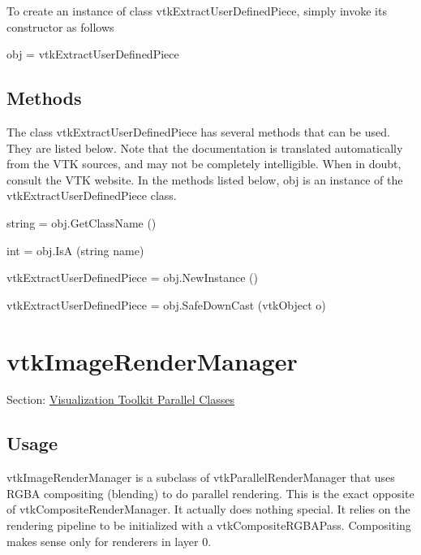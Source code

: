 To create an instance of class vtk\-Extract\-User\-Defined\-Piece, simply invoke its constructor as follows \begin{DoxyVerb}  obj = vtkExtractUserDefinedPiece
\end{DoxyVerb}
 \hypertarget{vtkwidgets_vtkxyplotwidget_Methods}{}\subsection{Methods}\label{vtkwidgets_vtkxyplotwidget_Methods}
The class vtk\-Extract\-User\-Defined\-Piece has several methods that can be used. They are listed below. Note that the documentation is translated automatically from the V\-T\-K sources, and may not be completely intelligible. When in doubt, consult the V\-T\-K website. In the methods listed below, {\ttfamily obj} is an instance of the vtk\-Extract\-User\-Defined\-Piece class. 
\begin{DoxyItemize}
\item {\ttfamily string = obj.\-Get\-Class\-Name ()}  
\item {\ttfamily int = obj.\-Is\-A (string name)}  
\item {\ttfamily vtk\-Extract\-User\-Defined\-Piece = obj.\-New\-Instance ()}  
\item {\ttfamily vtk\-Extract\-User\-Defined\-Piece = obj.\-Safe\-Down\-Cast (vtk\-Object o)}  
\end{DoxyItemize}\hypertarget{vtkparallel_vtkimagerendermanager}{}\section{vtk\-Image\-Render\-Manager}\label{vtkparallel_vtkimagerendermanager}
Section\-: \hyperlink{sec_vtkparallel}{Visualization Toolkit Parallel Classes} \hypertarget{vtkwidgets_vtkxyplotwidget_Usage}{}\subsection{Usage}\label{vtkwidgets_vtkxyplotwidget_Usage}
vtk\-Image\-Render\-Manager is a subclass of vtk\-Parallel\-Render\-Manager that uses R\-G\-B\-A compositing (blending) to do parallel rendering. This is the exact opposite of vtk\-Composite\-Render\-Manager. It actually does nothing special. It relies on the rendering pipeline to be initialized with a vtk\-Composite\-R\-G\-B\-A\-Pass. Compositing makes sense only for renderers in layer 0.

